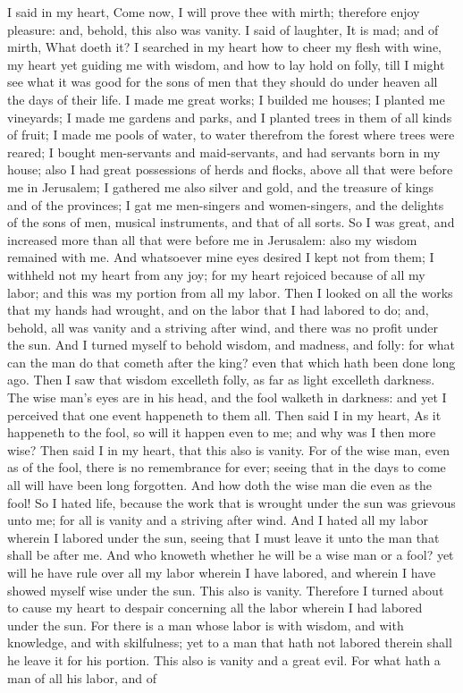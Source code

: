 I said in my heart, Come now, I will prove thee with mirth; therefore enjoy pleasure: and, behold, this also was vanity. I said of laughter, It is mad; and of mirth, What doeth it? I searched in my heart how to cheer my flesh with wine, my heart yet guiding me with wisdom, and how to lay hold on folly, till I might see what it was good for the sons of men that they should do under heaven all the days of their life. I made me great works; I builded me houses; I planted me vineyards; I made me gardens and parks, and I planted trees in them of all kinds of fruit; I made me pools of water, to water therefrom the forest where trees were reared; I bought men-servants and maid-servants, and had servants born in my house; also I had great possessions of herds and flocks, above all that were before me in Jerusalem; I gathered me also silver and gold, and the treasure of kings and of the provinces; I gat me men-singers and women-singers, and the delights of the sons of men, musical instruments, and that of all sorts. So I was great, and increased more than all that were before me in Jerusalem: also my wisdom remained with me. And whatsoever mine eyes desired I kept not from them; I withheld not my heart from any joy; for my heart rejoiced because of all my labor; and this was my portion from all my labor. Then I looked on all the works that my hands had wrought, and on the labor that I had labored to do; and, behold, all was vanity and a striving after wind, and there was no profit under the sun.  And I turned myself to behold wisdom, and madness, and folly: for what can the man do that cometh after the king? even that which hath been done long ago. Then I saw that wisdom excelleth folly, as far as light excelleth darkness. The wise man’s eyes are in his head, and the fool walketh in darkness: and yet I perceived that one event happeneth to them all. Then said I in my heart, As it happeneth to the fool, so will it happen even to me; and why was I then more wise? Then said I in my heart, that this also is vanity. For of the wise man, even as of the fool, there is no remembrance for ever; seeing that in the days to come all will have been long forgotten. And how doth the wise man die even as the fool! So I hated life, because the work that is wrought under the sun was grievous unto me; for all is vanity and a striving after wind.  And I hated all my labor wherein I labored under the sun, seeing that I must leave it unto the man that shall be after me. And who knoweth whether he will be a wise man or a fool? yet will he have rule over all my labor wherein I have labored, and wherein I have showed myself wise under the sun. This also is vanity. Therefore I turned about to cause my heart to despair concerning all the labor wherein I had labored under the sun. For there is a man whose labor is with wisdom, and with knowledge, and with skilfulness; yet to a man that hath not labored therein shall he leave it for his portion. This also is vanity and a great evil. For what hath a man of all his labor, and of 